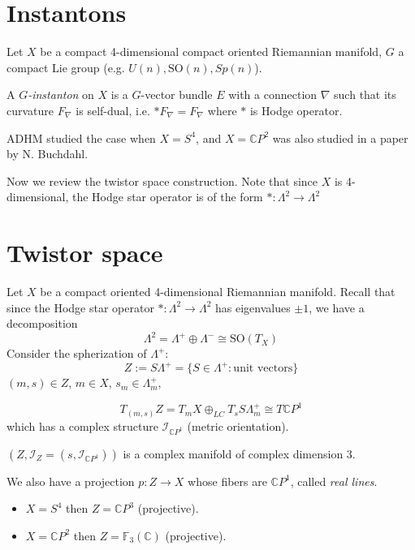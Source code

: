 \section{Instantons}
\label{section-instantons}

\noindent
Let $X$ be a compact 4-dimensional compact oriented
Riemannian manifold, $G$ a compact Lie group
(e.g. $U(n), \text{SO}(n),Sp(n)$).

\begin{definition}
\label{definition-g-instanton}
A {\it $G$-instanton} on $X$
is a $G$-vector bundle $E$
with a connection $\nabla$ such that its
curvature $F_{\nabla}$ is self-dual, i.e.
$*F_{\nabla}=F_{\nabla}$
where $*$ is Hodge operator.
\end{definition}

ADHM studied the case when $X=S^4$,
and $X=\mathbb{C}P^2$ was also studied in a 
paper by N. Buchdahl.

\medskip\noindent
Now we review the twistor space construction.
Note that since $X$ is 4-dimensional,
the Hodge star operator is of the form
$*:\Lambda^2 \to \Lambda^2$





\section{Twistor space}
\label{section-twistor-space}

\noindent
Let $X$ be a compact oriented 4-dimensional Riemannian manifold.
Recall that since the Hodge star operator 
$*:\Lambda^2\to\Lambda^2$
has eigenvalues $\pm 1$,
we have a decomposition
$$
\Lambda^2=\Lambda^+ \oplus \Lambda^- \cong \text{SO}(T_X)
$$
Consider the spherization of $\Lambda^+$:
$$
Z:=S\Lambda^+=\{S \in \Lambda^+:\text{unit vectors}\}
$$
$(m,s) \in Z$, $m \in X$, $s_m \in \Lambda^+_m$,

$$
T_{(m,s)}Z=
T_mX \oplus_{LC}T_sS \Lambda^+_m
\cong T\mathbb{C}P^1
$$
which has a complex structure $\mathcal{I}_{\mathbb{C}P^1}$
(metric orientation).

\begin{theorem}
\label{theorem-twistor-space}
$(Z,\mathcal{I}_Z=(s,\mathcal{I}_{\mathbb{C}P^1}))$
is a complex manifold of complex dimension 3.
\end{theorem}

\noindent
We also have a projection $p:Z \to X $
whose fibers are $\mathbb{C}P^1$, called {\it real lines}.

\begin{example}
\label{example-twistor-space}
\begin{itemize}
\item $X=S^4$ then $Z=\mathbb{C}P^3$ (projective).
\item $X=\mathbb{C}P^2$ then $Z=\mathbb{F}_3(\mathbb{C})$ (projective).
\end{itemize}
\end{example}

